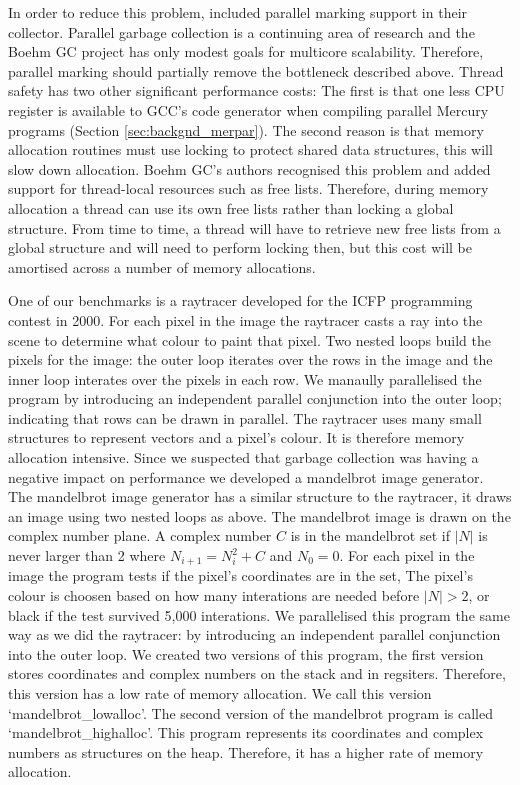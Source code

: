In order to reduce this problem,
\citet{boehm-gc} included parallel marking support in their collector.
Parallel garbage collection is a continuing area of research
and the Boehm GC project has only modest goals for multicore scalability.
Therefore,
parallel marking should partially remove the bottleneck described above.
Thread safety has two other significant performance costs:
The first is that
one less CPU register is available to GCC's code generator when compiling
parallel Mercury programs (Section \ref{sec:backgnd_merpar}).
The second reason is that
memory allocation routines must use locking to protect shared data
structures,
this will slow down allocation.
Boehm GC's authors recognised this problem and
added support for thread-local resources such as free lists.
Therefore,
during memory allocation a thread can use its own free lists rather than
locking a global structure.
From time to time, a thread will have to retrieve new free lists
from a global structure and will need to perform locking then,
but this cost will be amortised across a number of memory allocations.

One of our benchmarks is a raytracer developed for the
ICFP programming contest in 2000.
For each pixel in the image the raytracer casts a ray into the scene to
determine what colour to paint that pixel.
Two nested loops build the pixels for the image:
the outer loop iterates over the rows in the image and 
the inner loop interates over the pixels in each row.
We manaully parallelised the program by introducing an independent parallel
conjunction into the outer loop;
indicating that rows can be drawn in parallel.
The raytracer uses many small structures to represent vectors and a pixel's
colour.
It is therefore memory allocation intensive.
Since we suspected that garbage collection was having a negative impact on
performance we developed a mandelbrot image generator.
The mandelbrot image generator has a similar structure to the raytracer,
it draws an image using two nested loops as above.
The mandelbrot image is drawn on the complex number plane.
A complex number $C$ is in the mandelbrot set if
$|N|$ is never larger than 2 where $N_{i+1} = N_{i}^2 + C$ and $N_0 = 0$.
For each pixel in the image the program tests if the pixel's coordinates are
in the set,
The pixel's colour is choosen based on how many interations are needed
before $|N| > 2$,
or black if the test survived 5,000 interations.
We parallelised this program the same way as we did the raytracer:
by introducing an independent parallel conjunction into the outer loop.
We created two versions of this program,
the first version stores coordinates and complex numbers on the stack and in
regsiters.
Therefore, this version has a low rate of memory allocation.
We call this version `mandelbrot\_lowalloc'.
The second version of the mandelbrot program is called
`mandelbrot\_highalloc'.
This program represents its coordinates and complex numbers as structures on
the heap.
Therefore,
it has a higher rate of memory allocation.

